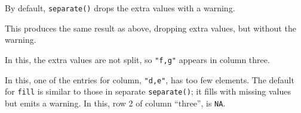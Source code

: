 \documentclass[]{book}
\newenvironment{Shaded}{\begin{snugshade}}{\end{snugshade}}
\newcommand{\CommentTok}[1]{\textcolor[rgb]{0.56,0.35,0.01}{\textit{#1}}}
\newcommand{\DataTypeTok}[1]{\textcolor[rgb]{0.13,0.29,0.53}{#1}}
\newcommand{\KeywordTok}[1]{\textcolor[rgb]{0.13,0.29,0.53}{\textbf{#1}}}
\newcommand{\NormalTok}[1]{#1}
\newcommand{\OperatorTok}[1]{\textcolor[rgb]{0.81,0.36,0.00}{\textbf{#1}}}
\newcommand{\StringTok}[1]{\textcolor[rgb]{0.31,0.60,0.02}{#1}}
\theoremstyle{plain}
\theoremstyle{remark}
\theoremstyle{definition}
\theoremstyle{definition}
\theoremstyle{definition}
\theoremstyle{remark}
\begin{document}
By default, \texttt{separate()} drops the extra values with a warning.

\begin{Shaded}
\end{Shaded}

This produces the same result as above, dropping extra values, but
without the warning.

\begin{Shaded}
\end{Shaded}

In this, the extra values are not split, so \texttt{"f,g"} appears in
column three.

In this, one of the entries for column, \texttt{"d,e"}, has too few
elements. The default for \texttt{fill} is similar to those in separate
\texttt{separate()}; it fills with missing values but emits a warning.
In this, row 2 of column ``three'', is \texttt{NA}.
\end{document}
